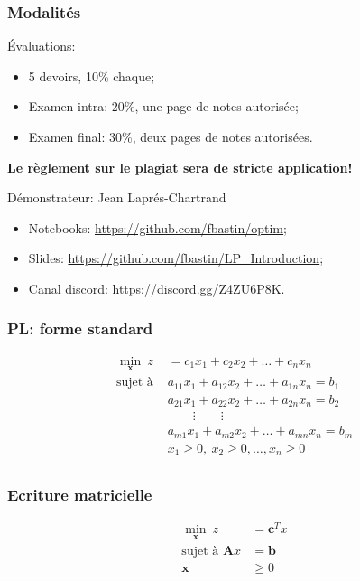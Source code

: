 \documentclass[usepdftitle=false]{beamer}
\def\bb{\boldsymbol{b}}
\def\bc{\boldsymbol{c}}
\def\bx{\boldsymbol{x}}
\def\bA{\boldsymbol{A}}
\begin{document}
\begin{frame}
\frametitle{Modalités}

Évaluations:
\begin{itemize}
	\item 5 devoirs, 10\% chaque;
	\item Examen intra: 20\%, une page de notes autorisée;
	\item Examen final: 30\%, deux pages de notes autorisées.
\end{itemize}
{\bf Le règlement sur le plagiat sera de stricte application!}

\mbox{}

Démonstrateur: Jean Laprés-Chartrand\\

\mbox{}

\begin{itemize}
	\item 
Notebooks: \url{https://github.com/fbastin/optim};
\item
Slides: \url{https://github.com/fbastin/LP_Introduction};
\item
Canal discord: \url{https://discord.gg/Z4ZU6P8K}.
\end{itemize}

\end{frame}

\begin{frame}
\frametitle{PL: forme standard}

\begin{align*}
\min_{\bx}\ z &= c_1x_1+c_2x_2+\ldots +c_nx_n \\
\mbox{sujet à } &
a_{11}x_1 + a_{12}x_2 + \ldots + a_{1n}x_n = b_1 \\
&a_{21}x_1 + a_{22}x_2 + \ldots + a_{2n}x_n = b_2 \\
& \qquad \vdots \qquad \vdots \\
& a_{m1}x_1 + a_{m2}x_2 + \ldots + a_{mn}x_n = b_m \\
& x_1 \geq 0,\ x_2 \geq 0, \ldots, x_n \geq 0 \\
\end{align*}

\mbox{}
\end{frame}

\begin{frame}
\frametitle{Ecriture matricielle}

\begin{align*}
\min_{\bx} \ z &= \bc^T x \\
\mbox{sujet à } \bA x &= \bb \\
\bx & \geq 0
\end{align*}

\end{frame}
\end{document}
